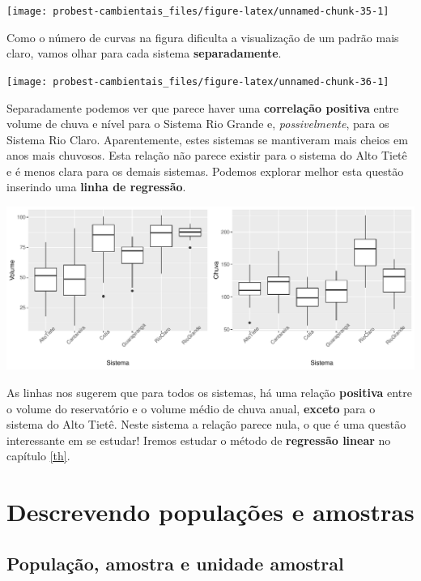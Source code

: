 \documentclass[
]{book}
\begin{document}
\begin{center}\texttt{[image: probest-cambientais\_files/figure-latex/unnamed-chunk-35-1]} \end{center}

Como o número de curvas na figura dificulta a visualização de um padrão mais claro, vamos olhar para cada sistema \textbf{separadamente}.

\begin{center}\texttt{[image: probest-cambientais\_files/figure-latex/unnamed-chunk-36-1]} \end{center}

Separadamente podemos ver que parece haver uma \textbf{correlação positiva} entre volume de chuva e nível para o Sistema Rio Grande e, \emph{possivelmente}, para os Sistema Rio Claro. Aparentemente, estes sistemas se mantiveram mais cheios em anos mais chuvosos. Esta relação não parece existir para o sistema do Alto Tietê e é menos clara para os demais sistemas. Podemos explorar melhor esta questão inserindo uma \textbf{linha de regressão}.

\begin{center}\includegraphics{probest-cambientais_files/figure-latex/unnamed-chunk-37-1} \end{center}

As linhas nos sugerem que para todos os sistemas, há uma relação \textbf{positiva} entre o volume do reservatório e o volume médio de chuva anual, \textbf{exceto} para o sistema do Alto Tietê. Neste sistema a relação parece nula, o que é uma questão interessante em se estudar! Iremos estudar o método de \textbf{regressão linear} no capítulo \ref{th}.

\hypertarget{posicao}{%
\chapter{Descrevendo populações e amostras}\label{posicao}}

\hypertarget{populauxe7uxe3o-amostra-e-unidade-amostral}{%
\section{População, amostra e unidade amostral}\label{populauxe7uxe3o-amostra-e-unidade-amostral}}
\end{document}
